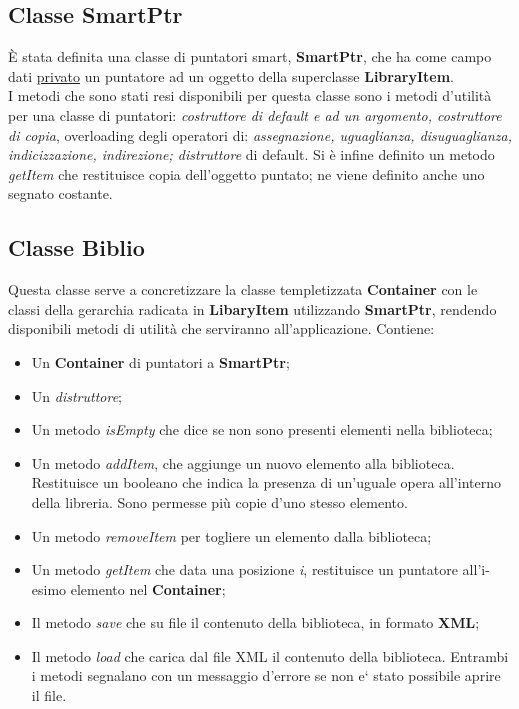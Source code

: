 {		\subsection{Classe SmartPtr}{
			È stata definita una classe di puntatori smart, \textbf{SmartPtr}, che ha come campo dati \underline{privato} un puntatore ad un oggetto della superclasse \textbf{LibraryItem}. \\
			I metodi che sono stati resi disponibili per questa classe sono i metodi d'utilità per una classe di puntatori:
			\textit{costruttore di default e ad un argomento, costruttore di copia}, overloading degli operatori di: \textit{assegnazione, uguaglianza, disuguaglianza, indicizzazione, indirezione; distruttore} di default. Si è infine definito un metodo \textit{getItem} che restituisce copia dell'oggetto puntato; ne viene definito anche uno segnato costante.
		}
		\subsection{Classe Biblio}{
			Questa classe serve a concretizzare la classe templetizzata \textbf{Container} con le classi della gerarchia radicata in \textbf{LibaryItem} utilizzando \textbf{SmartPtr}, rendendo disponibili metodi di utilità che serviranno all'applicazione. Contiene:
			\begin{itemize}\itemsep=0.5pt
				\item Un \textbf{Container} di puntatori a \textbf{SmartPtr};
				\item Un \textit{distruttore};
				\item Un metodo \textit{isEmpty} che dice se non sono presenti elementi nella biblioteca;
				\item Un  metodo \textit{addItem}, che aggiunge un nuovo elemento alla biblioteca. Restituisce un booleano che indica la presenza di un'uguale opera all'interno della libreria. Sono permesse più copie d'uno stesso elemento.
				\item Un metodo \textit{removeItem} per togliere un elemento dalla biblioteca;
				\item Un metodo \textit{getItem} che data una posizione \textit{i}, restituisce un puntatore all'i-esimo elemento nel \textbf{Container};
				\item Il metodo \textit{save} che su file il contenuto della biblioteca, in formato \textbf{XML};
				\item Il metodo \textit{load} che carica dal file XML il contenuto della biblioteca.
					Entrambi i metodi segnalano con un messaggio d'errore se non e` stato possibile aprire il file.
			\end{itemize}
		}
	}